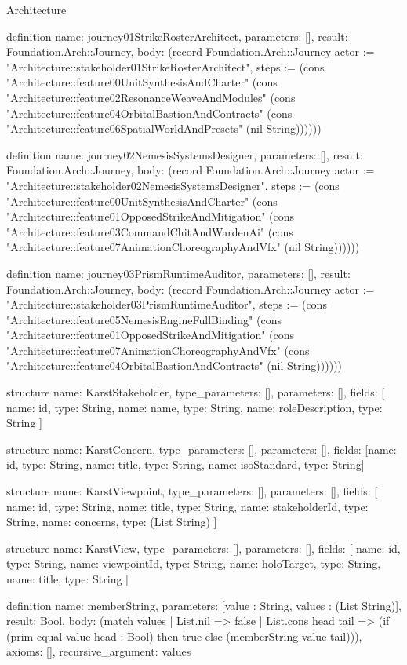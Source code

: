\begin{lexlean}{Architecture}
\begin{semanticmodule}
definition{
  name: journey01StrikeRosterArchitect,
  parameters: [],
  result: Foundation.Arch::Journey,
  body: (record Foundation.Arch::Journey {actor := "Architecture::stakeholder01StrikeRosterArchitect", steps := (cons "Architecture::feature00UnitSynthesisAndCharter" (cons "Architecture::feature02ResonanceWeaveAndModules" (cons "Architecture::feature04OrbitalBastionAndContracts" (cons "Architecture::feature06SpatialWorldAndPresets" (nil String)))))})
}

definition{
  name: journey02NemesisSystemsDesigner,
  parameters: [],
  result: Foundation.Arch::Journey,
  body: (record Foundation.Arch::Journey {actor := "Architecture::stakeholder02NemesisSystemsDesigner", steps := (cons "Architecture::feature00UnitSynthesisAndCharter" (cons "Architecture::feature01OpposedStrikeAndMitigation" (cons "Architecture::feature03CommandChitAndWardenAi" (cons "Architecture::feature07AnimationChoreographyAndVfx" (nil String)))))})
}

definition{
  name: journey03PrismRuntimeAuditor,
  parameters: [],
  result: Foundation.Arch::Journey,
  body: (record Foundation.Arch::Journey {actor := "Architecture::stakeholder03PrismRuntimeAuditor", steps := (cons "Architecture::feature05NemesisEngineFullBinding" (cons "Architecture::feature01OpposedStrikeAndMitigation" (cons "Architecture::feature07AnimationChoreographyAndVfx" (cons "Architecture::feature04OrbitalBastionAndContracts" (nil String)))))})
}

structure{
  name: KarstStakeholder,
  type_parameters: [],
  parameters: [],
  fields: [
    {name: id, type: String},
    {name: name, type: String},
    {name: roleDescription, type: String}
  ]
}

structure{
  name: KarstConcern,
  type_parameters: [],
  parameters: [],
  fields: [{name: id, type: String}, {name: title, type: String}, {name: isoStandard, type: String}]
}

structure{
  name: KarstViewpoint,
  type_parameters: [],
  parameters: [],
  fields: [
    {name: id, type: String},
    {name: title, type: String},
    {name: stakeholderId, type: String},
    {name: concerns, type: (List String)}
  ]
}

structure{
  name: KarstView,
  type_parameters: [],
  parameters: [],
  fields: [
    {name: id, type: String},
    {name: viewpointId, type: String},
    {name: holoTarget, type: String},
    {name: title, type: String}
  ]
}

definition{
  name: memberString,
  parameters: [value : String, values : (List String)],
  result: Bool,
  body: (match values
    | List.nil => false
    | List.cons head tail => (if (prim equal value head : Bool) then true else (memberString value tail))),
  axioms: [],
  recursive_argument: values
}


\end{semanticmodule}
\end{lexlean}
